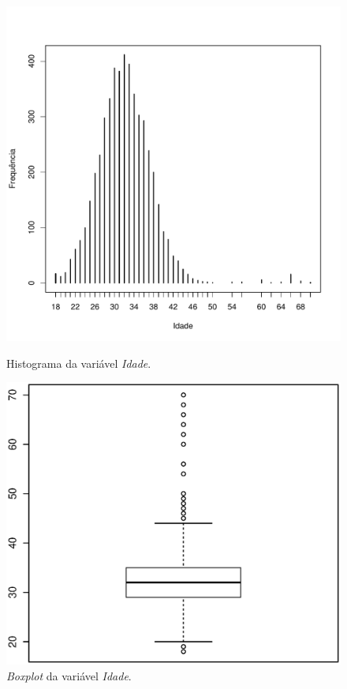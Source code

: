 \documentclass[10pt,a4paper,oneside]{article}
\begin{document}
\begin{figure}[h]
\centering
\begin{minipage}{0.49\textwidth}
	\centering
	\includegraphics[width=\linewidth]{plots/histograma-idade}
	\caption{Histograma da variável \textit{Idade}.}
	\label{figure:histograma-boxplot-idade}
\end{minipage}
%
\begin{minipage}{0.49\textwidth}
	\centering
	\includegraphics[width=\linewidth]{plots/boxplot_idade.eps}
	\caption{\textit{Boxplot} da variável \textit{Idade}.}
	\label{figure:histograma-boxplot-idade}
\end{minipage}
\end{figure}
\end{document}
